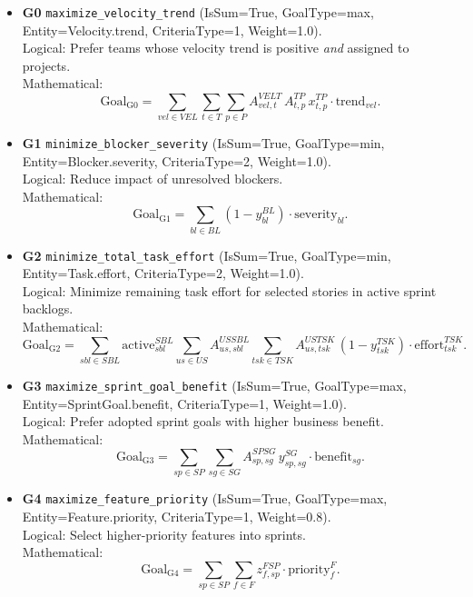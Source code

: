 \documentclass[11pt,a4paper]{article}
\begin{document}
\begin{itemize}[leftmargin=2.2em]
  \item \textbf{G0} \texttt{maximize\_velocity\_trend} (IsSum=True, GoalType=max, Entity=Velocity.trend, CriteriaType=1, Weight=1.0). \\
  Logical: Prefer teams whose velocity trend is positive \emph{and} assigned to projects. \\
  Mathematical:
  \[
  \text{Goal}_{\mathrm{G0}}=\sum_{vel\in VEL}\sum_{t\in T}\sum_{p\in P} A^{VEL T}_{vel,t}\, A^{TP}_{t,p}\, x^{TP}_{t,p}\cdot \text{trend}_{vel}.
  \]

  \item \textbf{G1} \texttt{minimize\_blocker\_severity} (IsSum=True, GoalType=min, Entity=Blocker.severity, CriteriaType=2, Weight=1.0). \\
  Logical: Reduce impact of unresolved blockers. \\
  Mathematical:
  \[
  \text{Goal}_{\mathrm{G1}}=\sum_{bl\in BL} (1-y^{BL}_{bl})\cdot \text{severity}_{bl}.
  \]

  \item \textbf{G2} \texttt{minimize\_total\_task\_effort} (IsSum=True, GoalType=min, Entity=Task.effort, CriteriaType=2, Weight=1.0). \\
  Logical: Minimize remaining task effort for selected stories in active sprint backlogs. \\
  Mathematical:
  \[
  \text{Goal}_{\mathrm{G2}}=\sum_{sbl\in SBL}\text{active}^{SBL}_{sbl}\sum_{us\in US} A^{US SBL}_{us,sbl}\sum_{tsk\in TSK}A^{US TSK}_{us,tsk}\,(1-y^{TSK}_{tsk})\cdot \text{effort}^{TSK}_{tsk}.
  \]

  \item \textbf{G3} \texttt{maximize\_sprint\_goal\_benefit} (IsSum=True, GoalType=max, Entity=SprintGoal.benefit, CriteriaType=1, Weight=1.0). \\
  Logical: Prefer adopted sprint goals with higher business benefit. \\
  Mathematical:
  \[
  \text{Goal}_{\mathrm{G3}}=\sum_{sp\in SP}\sum_{sg\in SG}A^{SP SG}_{sp,sg}\, y^{SG}_{sp,sg}\cdot \text{benefit}_{sg}.
  \]

  \item \textbf{G4} \texttt{maximize\_feature\_priority} (IsSum=True, GoalType=max, Entity=Feature.priority, CriteriaType=1, Weight=0.8). \\
  Logical: Select higher-priority features into sprints. \\
  Mathematical:
  \[
  \text{Goal}_{\mathrm{G4}}=\sum_{sp\in SP}\sum_{f\in F} z^{FSP}_{f,sp}\cdot \text{priority}^F_f.
  \]


\end{itemize}
\end{document}
